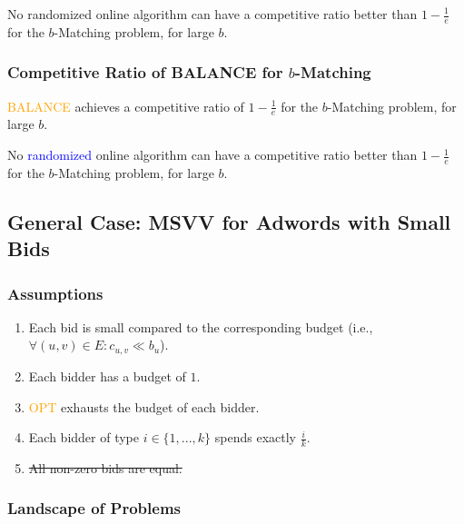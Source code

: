 \begin{frame}No randomized online algorithm can have a competitive ratio better than $1 - \frac{1}{e}$ for the $b$-Matching problem, for large $b$.
    \frametitle{Competitive Ratio of BALANCE for $b$-Matching}
    \begin{theorem}
        \textcolor{orange}{BALANCE} achieves a competitive ratio of $1 - \frac{1}{e}$ for the $b$-Matching problem, for large $b$.
    \end{theorem}
    \begin{theorem}
        No \textcolor{blue}{randomized} online algorithm can have a competitive ratio better than $1 - \frac{1}{e}$ for the $b$-Matching problem, for large $b$.
    \end{theorem}
\end{frame}

\subsection{General Case: MSVV for Adwords with Small Bids}

\begin{frame}
    \frametitle{Assumptions}
	\begin{enumerate}
        \item<1-> Each bid is small compared to the corresponding budget \mbox{(i.e., $\forall (u,v) \in E: c_{u,v} \ll b_u$}).
        \item<1-> Each bidder has a budget of $1$.
        \item<1-> \textcolor{orange}{OPT} exhausts the budget of each bidder.
        \item<1-> Each bidder of type $i \in \{1,...,k \}$ spends exactly $\frac{i}{k}$.
        \item<1-> \sout{All non-zero bids are equal.}
	\end{enumerate}
\end{frame}

\begin{frame}
    \frametitle{Landscape of Problems}
    \centering
\end{frame}

